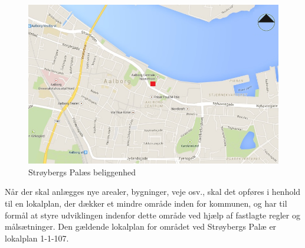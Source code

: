 \begin{figure}[htbp]
	\centering
	\includegraphics[width=1.0\textwidth]{billeder/aalborg.png}
	\caption{Strøybergs Palæs beliggenhed}
	\label{fig:aalborg}
\end{figure}

\indent{     }  Når der skal anlægges nye arealer, bygninger, veje osv., skal det opføres i henhold til en lokalplan, der dækker et mindre område inden for kommunen, og har til formål at styre udviklingen indenfor dette område ved hjælp af fastlagte regler og målsætninger. Den gældende lokalplan for området ved Strøybergs Palæ er lokalplan 1-1-107.
\newline
\newline


